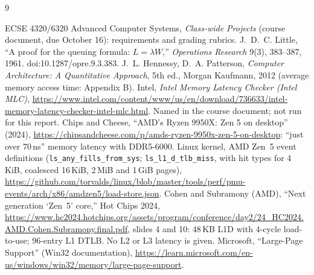 \documentclass{article}
\begin{document}
\begin{thebibliography}{9}
\raggedright\small
{} ECSE 4320/6320 Advanced Computer Systems, \emph{Class-wide Projects} (course document, due October 16): requirements and grading rubrics.
 J.~D.~C. Little, ``A proof for the queuing formula: $L=\lambda W$,'' \emph{Operations Research} 9(3), 383--387, 1961. doi:10.1287/opre.9.3.383.
 J.~L. Hennessy, D.~A. Patterson, \emph{Computer Architecture: A Quantitative Approach}, 5th ed., Morgan Kaufmann, 2012 (average memory access time: Appendix B).
 Intel, \emph{Intel Memory Latency Checker (Intel MLC)}, \url{https://www.intel.com/content/www/us/en/download/736633/intel-memory-latency-checker-intel-mlc.html}. Named in the course document; not run for this report.
 Chips and Cheese, ``AMD's Ryzen 9950X: Zen 5 on desktop'' (2024), \url{https://chipsandcheese.com/p/amds-ryzen-9950x-zen-5-on-desktop}: ``just over 70\,ns'' memory latency with DDR5-6000.
 Linux kernel, AMD Zen~5 event definitions (\texttt{ls\_any\_fills\_from\_sys}; \texttt{ls\_l1\_d\_tlb\_miss}, with hit types for 4\,KiB, coalesced 16\,KiB, 2\,MiB and 1\,GiB pages), \url{https://github.com/torvalds/linux/blob/master/tools/perf/pmu-events/arch/x86/amdzen5/load-store.json}.
 Cohen and Subramony (AMD), ``Next generation `Zen~5' core,'' Hot Chips 2024, \url{https://www.hc2024.hotchips.org/assets/program/conference/day2/24_HC2024.AMD.Cohen.Subramony.final.pdf}, slides 4 and 10: 48\,KB L1D with 4-cycle load-to-use; 96-entry L1 DTLB. No L2 or L3 latency is given.
 Microsoft, ``Large-Page Support'' (Win32 documentation), \url{https://learn.microsoft.com/en-us/windows/win32/memory/large-page-support}.
\end{thebibliography}

\appendix
\end{document}
